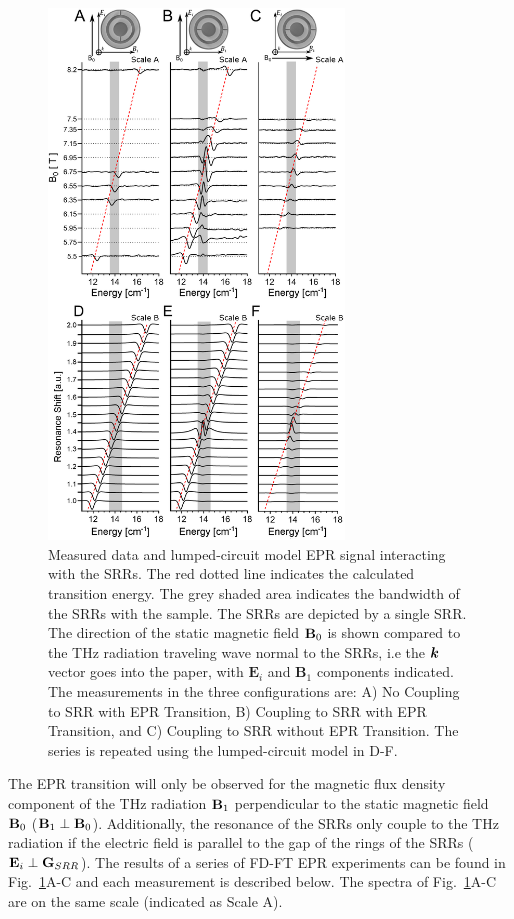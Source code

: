 \begin{figure}[htbp]\centering
  \includegraphics[width=0.7\textwidth]{Kapitel/Ch3-Images/HugeData.eps}%
  \caption[FD-FT EPR Data and Lumped-Circuit Model with SRRs]{Measured data and lumped-circuit model EPR signal interacting with the SRRs. The red dotted line indicates the calculated transition energy. The grey shaded area indicates the bandwidth of the SRRs with the sample. The SRRs are depicted by a single SRR. The direction of the static magnetic field $\textbf{B}_{0}$ is shown compared to the THz radiation traveling wave normal to the SRRs, i.e the $\boldsymbol{k}$ vector goes into the paper, with $\mathbf{E}_i$ and $\mathbf{B}_1$ components indicated. The measurements in the three configurations are: A) No Coupling to SRR with EPR Transition, B) Coupling to SRR with EPR Transition, and C) Coupling to SRR without EPR Transition. The series is repeated using the lumped-circuit model in D-F.\label{ch3-fig:datacompare}}
\end{figure}

The EPR transition will only be observed for the magnetic flux density component of the THz radiation $\textbf{B}_{1}$ perpendicular to the static magnetic field $\textbf{B}_{0}$ ($\textbf{B}_{1} \perp \textbf{B}_{0}$). \cite{Nehrkorn15_PRL} Additionally, the resonance of the SRRs only couple to the THz radiation if the electric field is parallel to the gap of the rings of the SRRs ($\textbf{E}_{i}\perp\textbf{G}_{SRR}$). \cite{Katsarakis04} The results of a series of FD-FT EPR experiments can be found in Fig.~\ref{ch3-fig:datacompare}A-C and each measurement is described below. The spectra of Fig.~\ref{ch3-fig:datacompare}A-C are on the same scale (indicated as Scale A).

